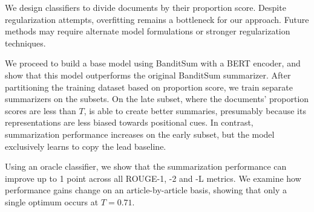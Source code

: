 We design classifiers to divide documents by their proportion score. Despite regularization attempts, overfitting remains a bottleneck for our approach. Future methods may require alternate model formulations or stronger regularization techniques.

We proceed to build a base model using BanditSum with a BERT encoder, and show that this model outperforms the original BanditSum summarizer. After partitioning the training dataset based on proportion score, we train separate summarizers on the subsets. On the late subset, where the documents' proportion scores are less than $T$, \BanSumLate{} is able to create better summaries, presumably because its representations are less biased towards positional cues. In contrast, \BanSumEarly{} summarization performance increases on the early subset, but the model exclusively learns to copy the lead baseline.

Using an oracle classifier, we show that the summarization performance can improve up to 1 point across all ROUGE-1, -2 and -L metrics. We examine how performance gains change on an article-by-article basis, showing that only a single optimum occurs at $T = 0.71$.
